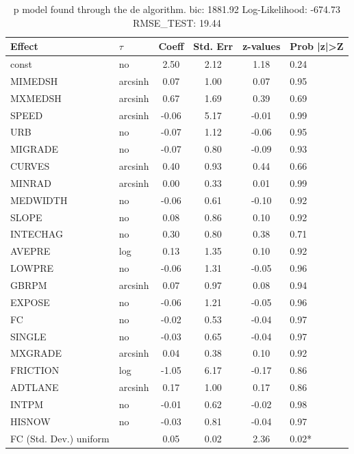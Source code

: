\begin{table}
	\caption{p model found through the de algorithm. bic: 1881.92 Log-Likelihood: -674.73 RMSE_TEST: 19.44}
	\begin{center}
		\begin{tabular}{|l|l|c|c|c|l|}
			\hline
			Effect & $\tau$ & Coeff & Std. Err & z-values & Prob |z|>Z \\
			\hline
			const & no & 2.50 & 2.12 & 1.18 & 0.24 \\
			\hline
			MIMEDSH & arcsinh & 0.07 & 1.00 & 0.07 & 0.95 \\
			\hline
			MXMEDSH & arcsinh & 0.67 & 1.69 & 0.39 & 0.69 \\
			\hline
			SPEED & arcsinh & -0.06 & 5.17 & -0.01 & 0.99 \\
			\hline
			URB & no & -0.07 & 1.12 & -0.06 & 0.95 \\
			\hline
			MIGRADE & no & -0.07 & 0.80 & -0.09 & 0.93 \\
			\hline
			CURVES & arcsinh & 0.40 & 0.93 & 0.44 & 0.66 \\
			\hline
			MINRAD & arcsinh & 0.00 & 0.33 & 0.01 & 0.99 \\
			\hline
			MEDWIDTH & no & -0.06 & 0.61 & -0.10 & 0.92 \\
			\hline
			SLOPE & no & 0.08 & 0.86 & 0.10 & 0.92 \\
			\hline
			INTECHAG & no & 0.30 & 0.80 & 0.38 & 0.71 \\
			\hline
			AVEPRE & log & 0.13 & 1.35 & 0.10 & 0.92 \\
			\hline
			LOWPRE & no & -0.06 & 1.31 & -0.05 & 0.96 \\
			\hline
			GBRPM & arcsinh & 0.07 & 0.97 & 0.08 & 0.94 \\
			\hline
			EXPOSE & no & -0.06 & 1.21 & -0.05 & 0.96 \\
			\hline
			FC & no & -0.02 & 0.53 & -0.04 & 0.97 \\
			\hline
			SINGLE & no & -0.03 & 0.65 & -0.04 & 0.97 \\
			\hline
			MXGRADE & arcsinh & 0.04 & 0.38 & 0.10 & 0.92 \\
			\hline
			FRICTION & log & -1.05 & 6.17 & -0.17 & 0.86 \\
			\hline
			ADTLANE & arcsinh & 0.17 & 1.00 & 0.17 & 0.86 \\
			\hline
			INTPM & no & -0.01 & 0.62 & -0.02 & 0.98 \\
			\hline
			HISNOW & no & -0.03 & 0.81 & -0.04 & 0.97 \\
			\hline
			FC (Std. Dev.) uniform &  & 0.05 & 0.02 & 2.36 & 0.02* \\

\end{tabular}
\end{center}
\end{table}

